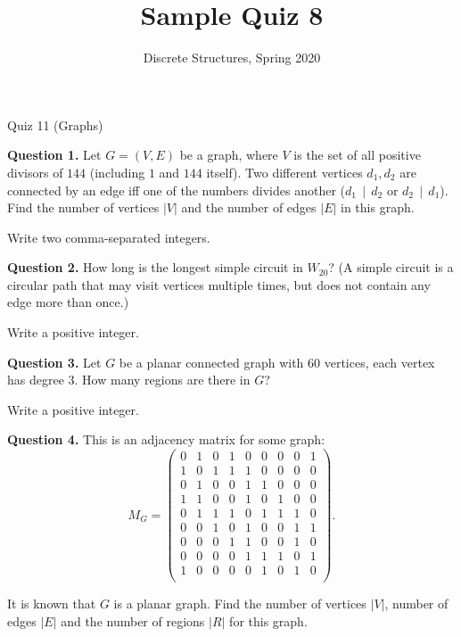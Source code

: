 \documentclass[jou]{apa6}
\title{Sample Quiz 8}
\author{Discrete Structures, Spring 2020}
\affiliation{RBS}
\begin{document}
\thispagestyle{empty}

\twocolumn
{\Large Quiz 11 (Graphs)}

\vspace{4pt}
{\bf Question 1.}
Let $G = (V,E)$ be a graph, where $V$ is the set of all positive divisors of $144$ (including 
$1$ and $144$ itself). Two different vertices $d_1,d_2$ are connected by an edge iff one of the
numbers divides another ($d_1\,\mid\,d_2$ or $d_2\,\mid\,d_1$). 
Find the number of vertices $|V|$ and the number of edges $|E|$ in this graph.

Write two comma-separated integers.


\vspace{10pt}
{\bf Question 2.}
How long is the longest simple circuit in $W_{20}$? 
(A simple circuit is a circular path that may visit vertices multiple times, 
but does not contain any edge more than once.)

Write a positive integer. 




\vspace{10pt}
{\bf Question 3.}
Let $G$ be a planar connected graph with $60$ vertices, each vertex has degree $3$. 
How many regions are there in $G$?

Write a positive integer.



\vspace{10pt}
{\bf Question 4.} This is an adjacency matrix for some graph:
{\footnotesize
$$M_G = \left( 
\begin{array}{ccccccccc}
0 & 1 & 0 & 1 & 0 & 0 & 0 & 0 & 1 \\
1 & 0 & 1 & 1 & 1 & 0 & 0 & 0 & 0 \\
0 & 1 & 0 & 0 & 1 & 1 & 0 & 0 & 0 \\
1 & 1 & 0 & 0 & 1 & 0 & 1 & 0 & 0 \\
0 & 1 & 1 & 1 & 0 & 1 & 1 & 1 & 0 \\
0 & 0 & 1 & 0 & 1 & 0 & 0 & 1 & 1 \\
0 & 0 & 0 & 1 & 1 & 0 & 0 & 1 & 0 \\
0 & 0 & 0 & 0 & 1 & 1 & 1 & 0 & 1 \\
1 & 0 & 0 & 0 & 0 & 1 & 0 & 1 & 0 \\
\end{array} \right).$$
}

It is known that $G$ is a planar graph. Find the number of vertices $|V|$, 
number of edges $|E|$ and the number of regions $|R|$ for this graph. 
\end{document}
